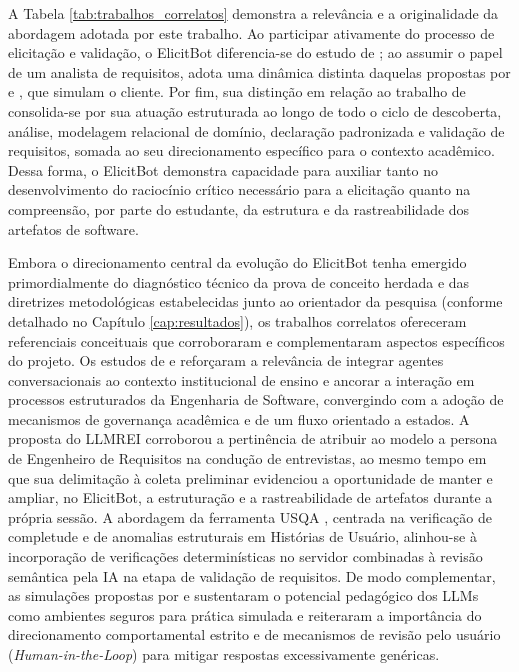 A Tabela \ref{tab:trabalhos_correlatos} demonstra a relevância e a originalidade da abordagem adotada por este trabalho. Ao participar ativamente do processo de elicitação e validação, o ElicitBot diferencia-se do estudo de ; ao assumir o papel de um analista de requisitos, adota uma dinâmica distinta daquelas propostas por  e , que simulam o cliente. Por fim, sua distinção em relação ao trabalho de  consolida-se por sua atuação estruturada ao longo de todo o ciclo de descoberta, análise, modelagem relacional de domínio, declaração padronizada e validação de requisitos, somada ao seu direcionamento específico para o contexto acadêmico. Dessa forma, o ElicitBot demonstra capacidade para auxiliar tanto no desenvolvimento do raciocínio crítico necessário para a elicitação quanto na compreensão, por parte do estudante, da estrutura e da rastreabilidade dos artefatos de software.

Embora o direcionamento central da evolução do ElicitBot tenha emergido primordialmente do diagnóstico técnico da prova de conceito herdada e das diretrizes metodológicas estabelecidas junto ao orientador da pesquisa (conforme detalhado no Capítulo \ref{cap:resultados}), os trabalhos correlatos ofereceram referenciais conceituais que corroboraram e complementaram aspectos específicos do projeto. Os estudos de  e  reforçaram a relevância de integrar agentes conversacionais ao contexto institucional de ensino e ancorar a interação em processos estruturados da Engenharia de Software, convergindo com a adoção de mecanismos de governança acadêmica e de um fluxo orientado a estados. A proposta do LLMREI \cite{korn2025} corroborou a pertinência de atribuir ao modelo a persona de Engenheiro de Requisitos na condução de entrevistas, ao mesmo tempo em que sua delimitação à coleta preliminar evidenciou a oportunidade de manter e ampliar, no ElicitBot, a estruturação e a rastreabilidade de artefatos durante a própria sessão. A abordagem da ferramenta USQA \cite{jimenez2023}, centrada na verificação de completude e de anomalias estruturais em Histórias de Usuário, alinhou-se à incorporação de verificações determinísticas no servidor combinadas à revisão semântica pela IA na etapa de validação de requisitos. De modo complementar, as simulações propostas por  e  sustentaram o potencial pedagógico dos LLMs como ambientes seguros para prática simulada e reiteraram a importância do direcionamento comportamental estrito e de mecanismos de revisão pelo usuário (\textit{Human-in-the-Loop}) para mitigar respostas excessivamente genéricas.

